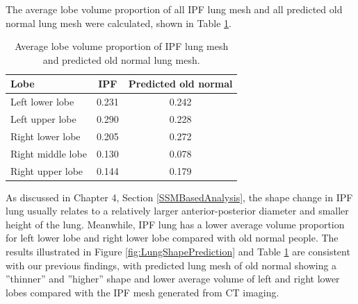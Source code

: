 The average lobe volume proportion of all IPF lung mesh and all predicted old normal lung mesh were calculated, shown in Table \ref{tab:AverageLobeVolume_Predicted}.


\begin{table}[htbp]
\centering
\caption{Average lobe volume proportion of IPF lung mesh and predicted old normal lung mesh.}
\label{tab:AverageLobeVolume_Predicted}
\begin{tabular}{| l | c | c |}
\hline
\bf{Lobe} & \bf{IPF} & \bf{Predicted old normal} \\
\hline
Left lower lobe & 0.231 & 0.242\\
\hline
Left upper lobe	& 0.290 & 0.228\\
\hline
Right lower lobe	& 0.205 & 0.272\\
\hline
Right middle lobe	& 0.130 & 0.078\\
\hline
Right upper lobe	& 0.144 & 0.179\\
\hline
\end{tabular}
\end{table}

As discussed in Chapter 4, Section \ref{SSMBasedAnalysis}, the shape change in IPF lung usually relates to a relatively larger anterior-posterior diameter and smaller height of the lung. Meanwhile, IPF lung has a lower average volume proportion for left lower lobe and right lower lobe compared with old normal people. The results illustrated in Figure \ref{fig:LungShapePrediction} and Table \ref{tab:AverageLobeVolume_Predicted} are consistent with our previous findings, with predicted lung mesh of old normal showing a ''thinner'' and ''higher'' shape and lower average volume of left and right lower lobes compared with the IPF mesh generated from CT imaging. 


